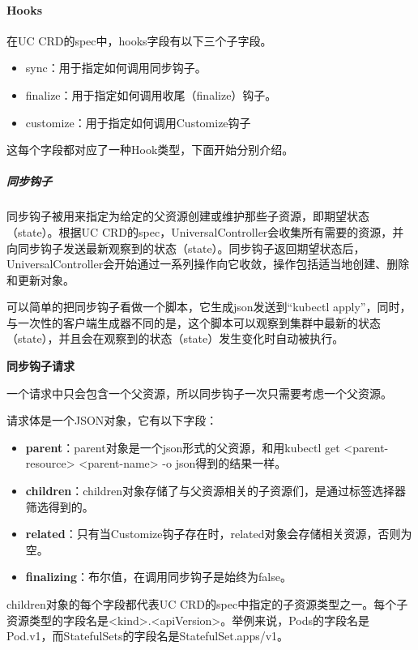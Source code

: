 \documentclass[macfonts,master]{njuthesis}
\begin{document}
\paragraph{Hooks}
在UC CRD的spec中，hooks字段有以下三个子字段。

\begin{itemize}
	\item sync：用于指定如何调用同步钩子。
	\item finalize：用于指定如何调用收尾（finalize）钩子。
	\item customize：用于指定如何调用Customize钩子
\end{itemize}

这每个字段都对应了一种Hook类型，下面开始分别介绍。

\subparagraph{同步钩子}

同步钩子被用来指定为给定的父资源创建或维护那些子资源，即期望状态（state）。根据UC CRD的spec，UniversalController会收集所有需要的资源，并向同步钩子发送最新观察到的状态（state）。同步钩子返回期望状态后，UniversalController会开始通过一系列操作向它收敛，操作包括适当地创建、删除和更新对象。

可以简单的把同步钩子看做一个脚本，它生成json发送到“kubectl apply”，同时，与一次性的客户端生成器不同的是，这个脚本可以观察到集群中最新的状态（state），并且会在观察到的状态（state）发生变化时自动被执行。

\textbf{同步钩子请求}

一个请求中只会包含一个父资源，所以同步钩子一次只需要考虑一个父资源。

请求体是一个JSON对象，它有以下字段：

\begin{itemize}
	\item \textbf{parent}：parent对象是一个json形式的父资源，和用kubectl get <parent-resource> <parent-name> -o json得到的结果一样。
	\item \textbf{children}：children对象存储了与父资源相关的子资源们，是通过标签选择器筛选得到的。
	\item \textbf{related}：只有当Customize钩子存在时，related对象会存储相关资源，否则为空。
	\item \textbf{finalizing}：布尔值，在调用同步钩子是始终为false。
\end{itemize}

children对象的每个字段都代表UC CRD的spec中指定的子资源类型之一。每个子资源类型的字段名是<kind>.<apiVersion>。举例来说，Pods的字段名是Pod.v1，而StatefulSets的字段名是StatefulSet.apps/v1。
\end{document}
